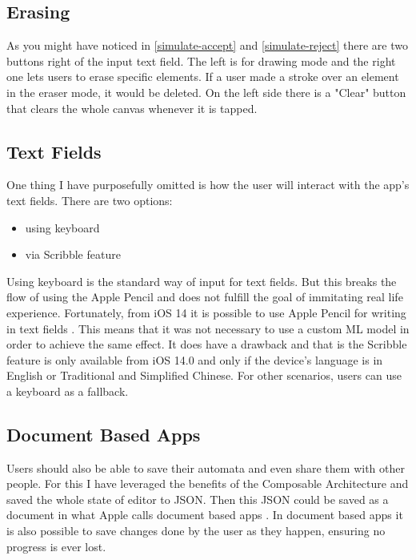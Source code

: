 \subsection{Erasing}

As you might have noticed in \ref{simulate-accept} and \ref{simulate-reject} there are two buttons right of the input text field. The left is for drawing mode and the right one lets users to erase specific elements. If a user made a stroke over an element in the eraser mode, it would be deleted. On the left side there is a "Clear" button that clears the whole canvas whenever it is tapped.

\subsection{Text Fields}

One thing I have purposefully omitted is how the user will interact with the app's text fields. There are two options:
\begin{itemize}
    \item using keyboard
    \item via Scribble feature
\end{itemize}

Using keyboard is the standard way of input for text fields. But this breaks the flow of using the Apple Pencil and does not fulfill the goal of immitating real life experience. Fortunately, from iOS 14 it is possible to use Apple Pencil for writing in text fields \cite{scribble}. This means that it was not necessary to use a custom ML model in order to achieve the same effect. It does have a drawback and that is the Scribble feature is only available from iOS 14.0 and only if the device's language is in English or Traditional and Simplified Chinese. For other scenarios, users can use a keyboard as a fallback.

\subsection{Document Based Apps}

Users should also be able to save their automata and even share them with other people. For this I have leveraged the benefits of the Composable Architecture and saved the whole state of editor to JSON. Then this JSON could be saved as a document in what Apple calls document based apps \cite{document-based}. In document based apps it is also possible to save changes done by the user as they happen, ensuring no progress is ever lost.

